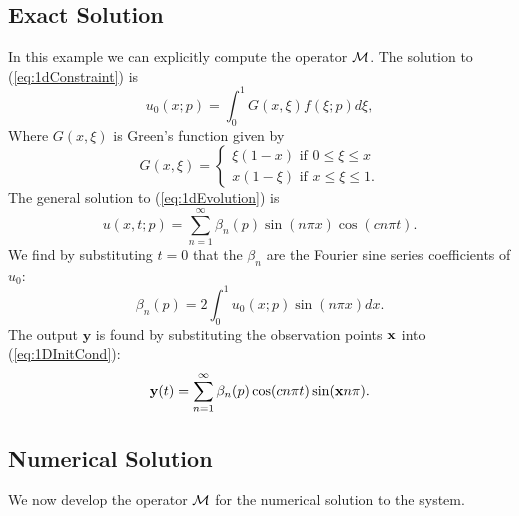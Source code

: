 \subsection{Exact Solution}
In this example we can explicitly compute the operator $\mathcal{M}$. The solution to (\ref{eq:1dConstraint}) is 
\begin{equation}\label{eq:1DInitCond}
u_0(x;p)=\int_0^1 G(x,\xi) f(\xi;p) d \xi,
\end{equation}
Where $G(x,\xi)$ is Green's function given by
\begin{equation}
\label{eq:Greens}
G(x,\xi)=\begin{cases} \xi(1-x) \mbox{ if } 0\leq \xi \leq x \\
					  x(1-\xi) \mbox{ if } x \leq \xi \leq 1.
		\end{cases}
\end{equation}
The general solution to (\ref{eq:1dEvolution}) is
\begin{equation}\label{eq:1Ddisplacements}
u(x,t;p)=\sum^{\infty}_{n=1} \beta_n(p)\sin(n\pi x)\cos(c n \pi t). 
\end{equation}
We find by substituting $t=0$ that the $\beta_n$ are the Fourier sine series coefficients of $u_0$:
\begin{equation}
\beta_n(p)=2\int_0^1 u_0(x;p) \sin(n\pi x) dx.
\end{equation}
The output $\mathbf{y}$ is found by substituting the observation points ${\mathbf{x}}$ into (\ref{eq:1DInitCond}):
\begin{equation}\label{eq:1Doutput}
{\mathbf{y}}(t)=\sum^{\infty}_{n=1} \beta_n(p)\cos(c n \pi t)\sin({\mathbf{x}} n\pi).
\end{equation}


\subsection{Numerical Solution}
We now develop the operator $\mathcal{M}$ for the numerical solution to the system.

